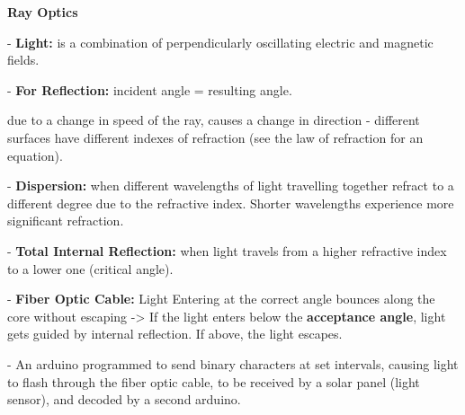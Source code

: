 \documentclass[12pt]{article}
\begin{document}
	{\centering \huge \bf Ray Optics \par}
	\vspace{20pt}
	\vspace{5pt}
	
	\noindent - {\bf Light:} is a combination of perpendicularly oscillating electric and magnetic fields.
	\vspace{5pt}
	
	\noindent - {\bf For Reflection:} incident angle = resulting angle.
	\vspace{5pt}
	
	 due to a change in speed of the ray, causes a change in direction - different surfaces have different indexes of refraction (see the law of refraction for an equation).
	\vspace{5pt}
	
	\noindent - {\bf Dispersion:} when different wavelengths of light travelling together refract to a different degree due to the refractive index. Shorter wavelengths experience more significant refraction.
	\vspace{5pt}
	
	\noindent - {\bf Total Internal Reflection:} when light travels from a higher refractive index to a lower one (critical angle).
	\vspace{5pt}
	
	\noindent - {\bf Fiber Optic Cable:} Light Entering at the correct angle bounces along the core without escaping -> If the light enters below the {\bf acceptance angle}, light gets guided by internal reflection. If above, the light escapes.
	\vspace{5pt}
	
	\vspace{20pt}
	\vspace{5pt}
	
	
	\noindent - An arduino programmed to send binary characters at set intervals, causing light to flash through the fiber optic cable, to be received by a solar panel (light sensor), and decoded by a second arduino. 
	\vspace{5pt}
	
	
\end{document}
